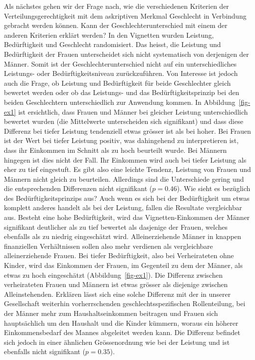 \documentclass[a4paper,12pt]{article}
\begin{document}

Als nächstes gehen wir der Frage nach, wie die verschiedenen Kriterien der
Verteilungsgerechtigkeit mit dem askriptiven Merkmal Geschlecht in Verbindung
gebracht werden können. Kann der Geschlechterunterschied mit einem der anderen
Kriterien erklärt werden? In den Vignetten wurden Leistung, Bedürftigkeit und
Geschlecht randomisiert. Das heisst, die Leistung und Bedürftigkeit der Frauen
unterscheidet sich nicht systematisch von derjenigen der Männer. Somit ist der
Geschlechterunterschied nicht auf ein unterschiedliches Leistungs- oder
Bedürftigkeitsniveau zurückzuführen. Von Interesse ist jedoch auch die Frage,
ob Leistung und Bedürftigkeit für beide Geschlechter gleich bewertet werden
oder ob das Leistungs- und das Bedürftigkeitsprinzip bei den beiden
Geschlechtern unterschiedlich zur Anwendung kommen. In Abbildung~\ref{fig-ex1}
ist ersichtlich, dass Frauen und Männer bei gleicher Leistung unterschiedlich
bewertet wurden (die Mittelwerte unterscheiden sich signifikant) und dass diese
Differenz bei tiefer Leistung tendenziell etwas grösser ist als bei hoher. Bei
Frauen ist der Wert bei tiefer Leistung positiv, was dahingehend zu
interpretieren ist, dass ihr Einkommen im Schnitt als zu hoch beurteilt wurde.
Bei Männern hingegen ist dies nicht der Fall. Ihr Einkommen wird auch bei
tiefer Leistung als eher zu tief eingestuft. Es gibt also eine leichte Tendenz,
Leistung von Frauen und Männern nicht gleich zu beurteilen. Allerdings sind die
Unterschiede gering und die entsprechenden Differenzen nicht signifikant
($p=0.46$). Wie sieht es bezüglich des Bedürftigkeitsprinzips aus? Auch wenn es
sich bei der Bedürftigkeit um etwas komplett anderes handelt als bei der
Leistung, fallen die Resultate vergleichbar aus. Besteht eine hohe
Bedürftigkeit, wird das Vignetten-Einkommen der Männer signifikant deutlicher
als zu tief bewertet als dasjenige der Frauen, welches ebenfalls als zu niedrig
eingeschätzt wird. Alleinerziehende Männer in knappen finanziellen
Verhältnissen sollen also mehr verdienen als vergleichbare alleinerziehende
Frauen. Bei tiefer Bedürftigkeit, also bei Verheirateten ohne Kinder, wird das
Einkommen der Frauen, im Gegenteil zu dem der Männer, als etwas zu hoch
eingeschätzt (Abbildung~\ref{fig-ex1}). Die Differenz zwischen verheirateten
Frauen und Männern ist etwas grösser als diejenige zwischen Alleinstehenden.
Erklären lässt sich eine solche Differenz mit der in unserer Gesellschaft
weiterhin vorherrschenden geschlechtsspezifischen Rollenteilung, bei der Männer
mehr zum Haushaltseinkommen beitragen und Frauen sich hauptsächlich um den
Haushalt und die Kinder kümmern, woraus ein höherer Einkommensbedarf des Mannes
abgeleitet werden kann. Die Differenz befindet sich jedoch in einer ähnlichen
Grössenordnung wie bei der Leistung und ist ebenfalls nicht signifikant
($p=0.35$).
\end{document}
